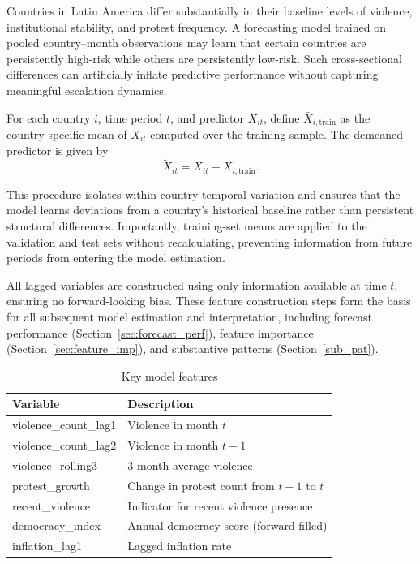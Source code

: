 \documentclass[12pt]{article}
\begin{document}
Countries in Latin America differ substantially in their baseline levels of violence, institutional stability, and protest frequency. A forecasting model trained on pooled country--month observations may learn that certain countries are persistently high-risk while others are persistently low-risk. Such cross-sectional differences can artificially inflate predictive performance without capturing meaningful escalation dynamics.

For each country $i$, time period $t$, and predictor $X_{it}$, define $\bar{X}_{i,\text{train}}$ as the country-specific mean of $X_{it}$ computed over the training sample. The demeaned predictor is given by
\[
\tilde{X}_{it} = X_{it} - \bar{X}_{i,\text{train}}.
\]

This procedure isolates within-country temporal variation and ensures that the model learns deviations from a country’s historical baseline rather than persistent structural differences. Importantly, training-set means are applied to the validation and test sets without recalculating, preventing information from future periods from entering the model estimation.

All lagged variables are constructed using only information available at time $t$, ensuring no forward-looking bias. These feature construction steps form the basis for all subsequent model estimation and interpretation, including forecast performance (Section~\ref{sec:forecast_perf}), feature importance (Section~\ref{sec:feature_imp}), and substantive patterns (Section~\ref{sub_pat}).

\begin{table}[H]
\centering
\caption{Key model features}
\begin{tabular}{ll}
\toprule
Variable & Description \\
\midrule
violence\_count\_lag1 & Violence in month $t$ \\
violence\_count\_lag2 & Violence in month $t-1$ \\
violence\_rolling3 & 3-month average violence \\
protest\_growth & Change in protest count from $t-1$ to $t$ \\
recent\_violence & Indicator for recent violence presence \\
democracy\_index & Annual democracy score (forward-filled) \\
inflation\_lag1 & Lagged inflation rate \\
\bottomrule
\end{tabular}
\end{table}
\end{document}
